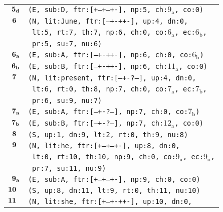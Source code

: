 \documentclass{article}
\begin{document}
\begin{minipage}{\textwidth}
{\begin{tabular}{|r|l|}
    ${\textbf{\textrm{5}}_{\textbf{\textrm{d}}}}$ & \texttt{\texttt{(E,~sub:D,~ftr:[+--+--+-],~np:5,~ch:${\textrm{9}_{\textrm{a}}}$,~co:0)}} \\
    ${\textbf{\textrm{6}}_{\phantom{z}}}$ & \texttt{\texttt{(N,~lit:June,~ftr:[---+-++-],~up:4,~dn:0,}} \\
    & \texttt{\texttt{~lt:5,~rt:7,~th:7,~np:6,~ch:0,~co:${\textrm{6}_{\textrm{a}}}$,~ec:${\textrm{6}_{\textrm{b}}}$,}} \\
    & \texttt{\texttt{~pr:5,~su:7,~nu:6)}} \\
    ${\textbf{\textrm{6}}_{\textbf{\textrm{a}}}}$ & \texttt{\texttt{(E,~sub:A,~ftr:[---+-++-],~np:6,~ch:0,~co:${\textrm{6}_{\textrm{b}}}$)}} \\
    ${\textbf{\textrm{6}}_{\textbf{\textrm{b}}}}$ & \texttt{\texttt{(E,~sub:B,~ftr:[---+-++-],~np:6,~ch:${\textrm{11}_{\textrm{a}}}$,~co:0)}} \\
    ${\textbf{\textrm{7}}_{\phantom{z}}}$ & \texttt{\texttt{(N,~lit:present,~ftr:[---+-?--],~up:4,~dn:0,}} \\
    & \texttt{\texttt{~lt:6,~rt:0,~th:8,~np:7,~ch:0,~co:${\textrm{7}_{\textrm{a}}}$,~ec:${\textrm{7}_{\textrm{b}}}$,}} \\
    & \texttt{\texttt{~pr:6,~su:9,~nu:7)}} \\
    ${\textbf{\textrm{7}}_{\textbf{\textrm{a}}}}$ & \texttt{\texttt{(E,~sub:A,~ftr:[---+-?--],~np:7,~ch:0,~co:${\textrm{7}_{\textrm{b}}}$)}} \\
    ${\textbf{\textrm{7}}_{\textbf{\textrm{b}}}}$ & \texttt{\texttt{(E,~sub:B,~ftr:[---+-?--],~np:7,~ch:${\textrm{12}_{\textrm{a}}}$,~co:0)}} \\
    ${\textbf{\textrm{8}}_{\phantom{z}}}$ & \texttt{\texttt{(S,~up:1,~dn:9,~lt:2,~rt:0,~th:9,~nu:8)}} \\
    ${\textbf{\textrm{9}}_{\phantom{z}}}$ & \texttt{\texttt{(N,~lit:he,~ftr:[+--+--+-],~up:8,~dn:0,}} \\
    & \texttt{\texttt{~lt:0,~rt:10,~th:10,~np:9,~ch:0,~co:${\textrm{9}_{\textrm{a}}}$,~ec:${\textrm{9}_{\textrm{a}}}$,}} \\
    & \texttt{\texttt{~pr:7,~su:11,~nu:9)}} \\
    ${\textbf{\textrm{9}}_{\textbf{\textrm{a}}}}$ & \texttt{\texttt{(E,~sub:A,~ftr:[+--+--+-],~np:9,~ch:0,~co:0)}} \\
    ${\textbf{\textrm{10}}_{\phantom{z}}}$ & \texttt{\texttt{(S,~up:8,~dn:11,~lt:9,~rt:0,~th:11,~nu:10)}} \\
    ${\textbf{\textrm{11}}_{\phantom{z}}}$ & \texttt{\texttt{(N,~lit:she,~ftr:[+--+-++-],~up:10,~dn:0,}} \\

\end{tabular}}
\end{minipage}
\end{document}
